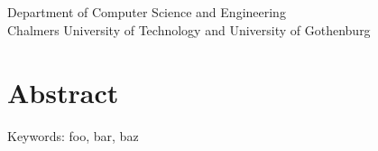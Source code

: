 
\noindent\oneLineTitle\\
\authorfirstname{} \authorlastname{}\\
Department of Computer Science and Engineering\\
Chalmers University of Technology and University of Gothenburg

\thispagestyle{plain}			%
\setlength{\parindent}{1.5em}
\section*{Abstract}

\lipsum[1-2]

\vfill
Keywords: foo, bar, baz

\newpage				%
\thispagestyle{empty}
\mbox{}

